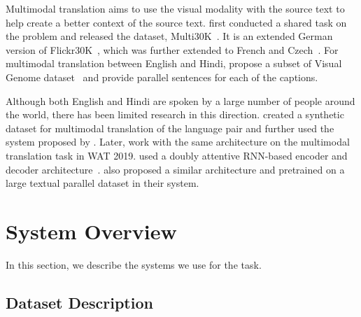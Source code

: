 \documentclass[11pt,a4paper]{article}
\begin{document}
Multimodal translation aims to use the visual modality with the source text to help create a better context of the source text. \citet{specia-etal-2016-shared} first conducted a shared task on the problem and released the dataset, Multi30K~\citep{W16-3210}. It is an extended German version of Flickr30K~\citep{young-etal-2014-image}, which was further extended to French and Czech~\citep{elliott-etal-2017-findings, barrault-etal-2018-findings}. For multimodal translation between English and Hindi, \citet{hindi-visual-genome:2019} propose a subset of Visual Genome dataset~\citep{10.1007/s11263-016-0981-7} and provide parallel sentences for each of the captions. 

Although both English and Hindi are spoken by a large number of people around the world, there has been limited research in this direction. \citet{dutta-chowdhury-etal-2018-multimodal} created a synthetic dataset for multimodal translation of the language pair and further used the system proposed by \citet{calixto-liu-2017-incorporating}. Later, \citet{sanayai-meetei-etal-2019-wat2019} work with the same architecture on the multimodal translation task in WAT 2019. \citet{laskar-etal-2019-english} used a doubly attentive RNN-based encoder and decoder architecture~\citep{calixto-liu-2017-incorporating,calixto-etal-2017-doubly}. \citet{laskar-etal-2020-multimodal} also proposed a similar architecture and pretrained on a large textual parallel dataset \citep{kunchukuttan-etal-2018-iit} in their system.

\section{System Overview}

In this section, we describe the systems we use for the task.

\subsection{Dataset Description}
\end{document}
